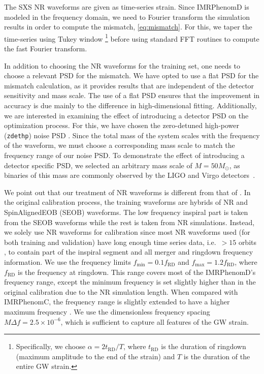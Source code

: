 \documentclass[twocolumn]{aastex631}
\newcommand{\zdethp}{\texttt{zdethp}}
\begin{document}
The SXS NR waveforms are given as time-series strain.
Since IMRPhenomD is modeled in the frequency domain, we need to Fourier transform the simulation results
in order to compute the mismatch, \eqref{eq:mismatch}.
For this, we taper the time-series using Tukey window \citep{usman2016pycbc}
\footnote{
	Specifically, we choose $\alpha=2t_{\mathrm{RD}}/T$, where
	$t_{\mathrm{RD}}$ is the duration of ringdown (maximum amplitude to the end of the strain) and $T$ is the duration of the
	entire GW strain. 
} 
before using standard FFT routines to compute the fast Fourier transform.

In addition to choosing the NR waveforms for the training set,
one needs to choose a relevant PSD for the mismatch.
We have opted to use a flat PSD for the mismatch calculation,
as it provides results that are independent of the detector sensitivity and mass scale.
The use of a flat PSD ensures that the improvement in accuracy is due mainly
to the difference in high-dimensional fitting.
Additionally, we are interested in examining the effect of introducing a detector PSD
on the optimization process. For this, we have chosen the
zero-detuned high-power (\zdethp) noise PSD \citep{aasi2015advanced}.
Since the total mass of the system scales with the frequency of the waveform,
we must choose a corresponding mass scale to match the frequency range of our noise PSD.
To demonstrate the effect of introducing a detector specific PSD,
we selected an arbitrary mass scale of $M=50M_{\odot}$, as binaries
of this mass are commonly observed by the LIGO and Virgo detectors~\citep{gwtc1, gwtc2, gwtc21, gwtc3}.

We point out that our treatment of NR waveforms is different from that of \citep{husa2016frequency, khan2016frequency}.
In the original calibration process, the training waveforms are hybrids of NR and SpinAlignedEOB (SEOB) waveforms.
The low frequency inspiral part is taken from the SEOB
waveforms while the rest is taken from NR simulations.
Instead, we solely use NR waveforms for calibration since most NR waveforms used (for both training and validation)
have long enough time series data, i.e.~$>15$ orbits \citep{boyle2019sxs}, to contain part of the inspiral segment and all
merger and ringdown frequency information. We use the frequency limits
$f_{\mathrm{min}}=0.1f_{\mathrm{RD}}$ and $f_{\mathrm{max}}=1.2f_{\mathrm{RD}}$,	
where $f_{\mathrm{RD}}$ is the frequency at ringdown. This range covers most of
the IMRPhenomD's frequency range, except the minimum frequency is set slightly higher
than in the original calibration due to the NR simulation length.
When compared with IMRPhenomC, the frequency range is slightly extended to have a higher maximum
frequency \citep{santamaria2010matching}.
We use the dimensionless frequency spacing $M\Delta f=2.5\times10^{-6}$, 
which is sufficient to capture all features of the GW strain. 
\end{document}
